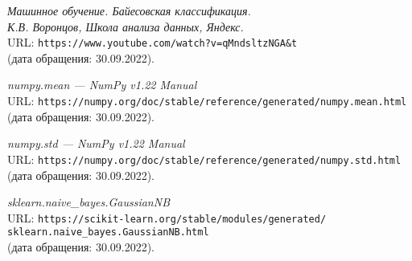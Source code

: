 \begin{thebibliography}{99}
{\itshape Машинное обучение. Байесовская классификация.\\К.В. Воронцов, Школа анализа данных, Яндекс.}\\
URL: \texttt{https://www.youtube.com/watch?v=qMndsltzNGA\&t}\\
(дата обращения: 30.09.2022).

{\itshape numpy.mean --- NumPy v1.22 Manual}\\
URL: \texttt{https://numpy.org/doc/stable/reference/generated/numpy.mean.html}\\
(дата обращения: 30.09.2022).

{\itshape numpy.std --- NumPy v1.22 Manual}\\
URL: \texttt{https://numpy.org/doc/stable/reference/generated/numpy.std.html}\\
(дата обращения: 30.09.2022).

{\itshape sklearn.naive\_bayes.GaussianNB}\\
URL: \texttt{https://scikit-learn.org/stable/modules/generated/\\sklearn.naive\_bayes.GaussianNB.html}\\
(дата обращения: 30.09.2022).

\end{thebibliography}
\pagebreak
